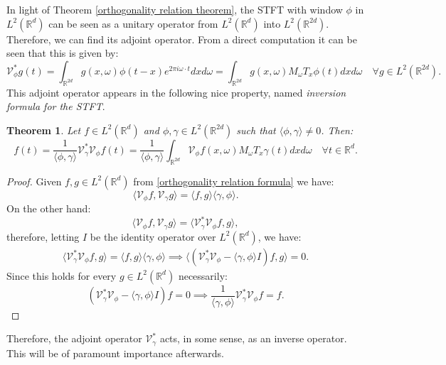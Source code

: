 \documentclass[corpo=11pt, stile=classica, tipotesi=custom,
greek, evenboxes, english]{toptesi}
\numberwithin{equation}{chapter}
\newtheorem{teo}{Theorem}[chapter] %
\theoremstyle{definition}
\theoremstyle{remark}
\newcommand{\R}{\mathbb{R}} %
\newcommand{\V}{\mathcal{V}} %
\begin{document}
In light of Theorem \ref{orthogonality relation theorem}, the STFT with window $\phi$ in $L^2(\R^d)$ can be seen as a unitary operator from $L^2(\R^d)$ into $L^2(\R^{2d})$. Therefore, we can find its adjoint operator. From a direct computation it can be seen that this is given by:
\begin{equation}\label{STFT adjoint}
	\V_{\phi}^* g(t) = \int_{\R^{2d}} g(x,\omega) \phi(t-x) e^{2 \pi i \omega \cdot t} dxd\omega = \int_{\R^{2d}} g(x,\omega) M_{\omega}T_x \phi (t) dxd\omega\quad \forall g \in L^2(\R^{2d}).
\end{equation}
This adjoint operator appears in the following nice property, named \emph{inversion formula for the STFT}.
\begin{teo}\label{inversion formula theorem}
	Let $f \in L^2(\R^d)$ and $\phi, \gamma \in L^2(\R^{2d})$ such that $\langle \phi, \gamma \rangle \neq 0$. Then:
	\begin{equation}\label{inversion formula}
		f(t) = \dfrac{1}{\langle \phi, \gamma \rangle} \V_{\gamma}^* \V_{\phi} f(t) = \dfrac{1}{\langle \phi, \gamma \rangle} \int_{\R^{2d}} \V_{\phi}f(x,\omega)M_{\omega}T_x \gamma (t) dxd\omega \quad \forall t \in \R^d.
	\end{equation}
\end{teo}
\begin{proof}
	Given $f,g \in L^2(\R^d)$ from \eqref{orthogonality relation formula} we have:
	\begin{equation*}
		\langle \V_{\phi} f, \V_{\gamma} g \rangle = \langle f,g \rangle \langle \gamma, \phi \rangle.
	\end{equation*}
	On the other hand:
	\begin{equation*}
		\langle \V_{\phi} f, \V_{\gamma} g \rangle = \langle \V_{\gamma}^* \V_{\phi} f, g \rangle,
	\end{equation*}
	therefore, letting $I$ be the identity operator over $L^2(\R^d)$, we have:
	\begin{align*}
		\langle \V_{\gamma}^* \V_{\phi} f, g \rangle = \langle f,g \rangle \langle \gamma, \phi \rangle \implies \langle (\V_{\gamma}^* \V_{\phi} - \langle \gamma, \phi \rangle I)f, g \rangle = 0.
	\end{align*}
	Since this holds for every $g \in L^2(\R^d)$ necessarily:
	\begin{equation*}
		(\V_{\gamma}^* \V_{\phi} - \langle \gamma, \phi \rangle I)f = 0 \implies \dfrac{1}{\langle \gamma, \phi \rangle}\V_{\gamma}^* \V_{\phi} f = f.
	\end{equation*}
\end{proof}
Therefore, the adjoint operator $\V_{\gamma}^*$ acts, in some sense, as an inverse operator. This will be of paramount importance afterwards.
\end{document}
